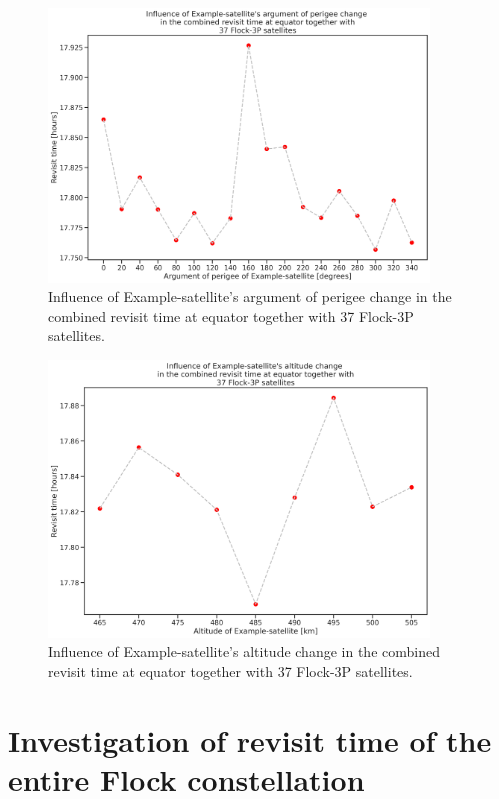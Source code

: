 \begin{figure}
\centering
\includegraphics[width=0.9\textwidth]{Images/revisit_time_of_Flocks_omega.png}
\caption{Influence of Example-satellite's argument of perigee change in the combined revisit time at equator together with 37 Flock-3P satellites.}
\label{revisit_time_of_Flocks_omega}
\end{figure}

\begin{figure}
\centering
\includegraphics[width=0.9\textwidth]{Images/revisit_time_of_altitude_Flocks.png}
\caption{Influence of Example-satellite's altitude change in the combined revisit time at equator together with 37 Flock-3P satellites.}
\label{revisit_time_of_altitude_Flocks}
\end{figure}

\bigskip
\section{Investigation of revisit time of the entire Flock constellation}
\bigskip

